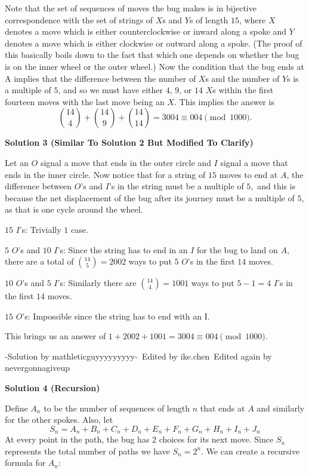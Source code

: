 \begin{enumerate}
Note that the set of sequences of moves the bug makes is in bijective correspondence with the set of strings of $X$s and $Y$s of length $15$, where $X$ denotes a move which is either counterclockwise or inward along a spoke and $Y$ denotes a move which is either clockwise or outward along a spoke.  (The proof of this basically boils down to the fact that which one depends on whether the bug is on the inner wheel or the outer wheel.)  Now the condition that the bug ends at A implies that the difference between the number of $X$s and the number of $Y$s is a multiple of $5$, and so we must have either $4$, $9$, or $14$ $X$s within the first fourteen moves with the last move being an $X$.  This implies the answer is 
 \[\binom{14}4+\binom{14}9+\binom{14}{14} = 3004\equiv \boxed{004}\pmod{1000}.\]




\textbf{Solution 3 (Similar To Solution 2 But Modified To Clarify)}

Let an $O$ signal a move that ends in the outer circle and $I$ signal a move that ends in the inner circle. Now notice that for a string of $15$ moves to end at $A$, the difference between $O$'s and $I$'s in the string must be a multiple of $5,$ and this is because the net displacement of the bug after its journey must be a multiple of $5$, as that is one cycle around the wheel.

 $15$ $I$'s: Trivially $1$ case.

 $5$ $O$'s and $10$ $I$'s: Since the string has to end in an $I$ for the bug to land on $A$, there are a total of $\binom{14}{5}=2002$ ways to put $5$ $O$'s in the first $14$ moves.

 $10$ $O$'s and $5$ $I$'s: Similarly there are $\binom{14}{4}=1001$ ways to put $5-1=4$ $I$'s in the first $14$ moves.

 $15$ $O$'s: Impossible since the string has to end with an I.

 This brings us an answer of $1+2002+1001=3004 \equiv \boxed{004} \pmod{1000}$.

 -Solution by mathleticguyyyyyyyyy-~Edited by ike.chen~Edited again by nevergonnagiveup

 



\textbf{Solution 4 (Recursion)}

Define $A_n$ to be the number of sequences of length $n$ that ends at $A$ and similarly for the other spokes. Also, let
 \[S_n=A_n+B_n+C_n+D_n+E_n+F_n+G_n+H_n+I_n+J_n\]At every point in the path, the bug has $2$ choices for its next move. Since $S_n$ represents the total number of paths we have $S_n=2^n$. We can create a recursive formula for $A_n:$


\end{enumerate}

